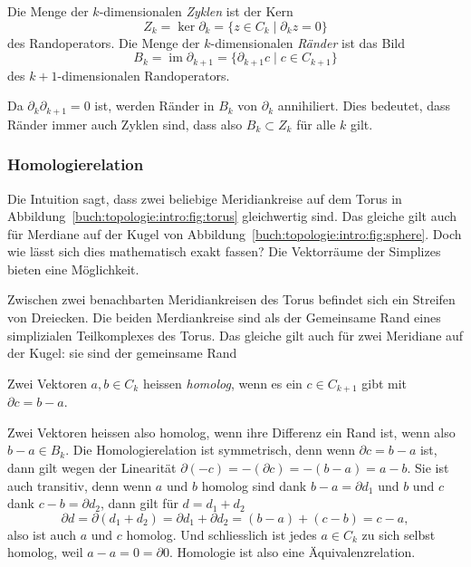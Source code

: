 \begin{definition}
Die Menge der $k$-dimensionalen {\em Zyklen} ist der Kern
%
\[
Z_k
=
\ker \partial_k 
=
\{ z\in C_k \mid \partial_kz = 0 \}
\]
des Randoperators.
Die Menge der $k$-dimensionalen {\em Ränder } ist das Bild
%
\[
B_k
=
\operatorname{im} \partial_{k+1}
=
\{ \partial_{k+1}c\mid c\in C_{k+1} \}
\]
des $k+1$-dimensionalen Randoperators.
\end{definition}

Da $\partial_{k}\partial_{k+1}=0$ ist, werden Ränder in $B_k$
von $\partial_k$ annihiliert.
Dies bedeutet, dass Ränder immer auch Zyklen sind, dass also
$B_k\subset Z_k$ für alle $k$ gilt.

%
%
\subsubsection{Homologierelation}
Die Intuition sagt, dass zwei beliebige Meridiankreise auf dem Torus in
Abbildung~\ref{buch:topologie:intro:fig:torus}
gleichwertig sind.
Das gleiche gilt auch für Merdiane auf der Kugel von
Abbildung~\ref{buch:topologie:intro:fig:sphere}.
Doch wie lässt sich dies mathematisch exakt fassen?
Die Vektorräume der Simplizes bieten eine Möglichkeit.

Zwischen zwei benachbarten Meridiankreisen des Torus befindet sich ein
Streifen von Dreiecken.
Die beiden Merdiankreise sind als der Gemeinsame Rand eines 
simplizialen Teilkomplexes des Torus.
Das gleiche gilt auch für zwei Meridiane auf der Kugel: sie sind
der gemeinsame Rand 

\begin{definition}[homolog]
Zwei Vektoren $a,b\in C_k$ heissen \emph{homolog}, 
wenn es ein $c\in C_{k+1}$ gibt mit $\partial c=b-a$.
\end{definition}

Zwei Vektoren heissen also homolog, wenn ihre Differenz ein Rand ist,
wenn also $b-a\in B_k$.
Die Homologierelation ist symmetrisch, denn wenn $\partial c=b-a$ ist,
dann gilt wegen der Linearität $\partial (-c) = -(\partial c)=-(b-a)=a-b$.
Sie ist auch transitiv, denn wenn $a$ und $b$ homolog sind dank
$b-a=\partial d_1$ und $b$ und $c$ dank $c-b=\partial d_2$, dann gilt
für $d=d_1+d_2$
\[
\partial d
=
\partial(d_1+d_2)
=
\partial d_1
+
\partial d_2
=
(b-a)+(c-b)
=
c-a,
\]
also ist auch $a$ und $c$ homolog.
Und schliesslich ist jedes $a\in C_k$ zu sich selbst homolog,
weil $a-a=0=\partial 0$.
Homologie ist also eine Äquivalenzrelation.

